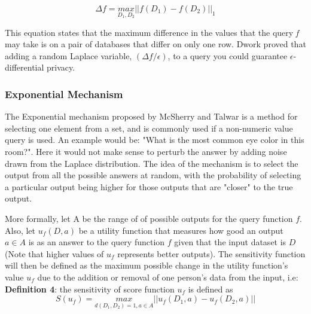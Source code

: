 $$\Delta \mathit{f}=\underset{D_1,D_2}{max}||\mathit{f(D_1)}-\mathit{f(D_2)}||_{1}$$

This equation states that the maximum difference in the values that the query \textit{f} may take is on a pair of databases that differ on only one row. Dwork proved that adding a random Laplace variable, $(\Delta f/\epsilon)$, to a query you could guarantee $\epsilon$-differential privacy\cite{dwork2013algorithmic}. 

\subsubsection{Exponential Mechanism}
The Exponential mechanism proposed by McSherry and Talwar \cite{mcsherry2007} is a method for selecting one element from a set, and is commonly used if a non-numeric value query is used. An example would be: "What is the most common eye color in this room?". Here it would not make sense to perturb the answer by adding noise drawn from the Laplace distribution. The idea of the mechanism is to select the output from all the possible answers at random, with the probability of selecting a particular output being higher for those outputs that are "closer" to the true output. 

More formally, let A be the range of of possible outputs for the query function $f$. Also, let $u_f(D,a)$ be a utility function that measures how good an output $a\in A$ is as an answer to the query function $f$ given that the input dataset is $D$ (Note that higher values of $u_f$ represents better outputs). The sensitivity function will then be defined as the maximum possible change in the utility function's value $u_f$ due to the addition or removal of one person's data from the input, i.e: \newline
\textbf{Definition 4}: the sensitivity of score function $u_f$ is defined as
$$S(u_f) = \underset{d(D_1,D_2)=1,a\in A}{max}||u_f(D_1, a)-u_f(D_2,a)||$$

\cleardoublepage
